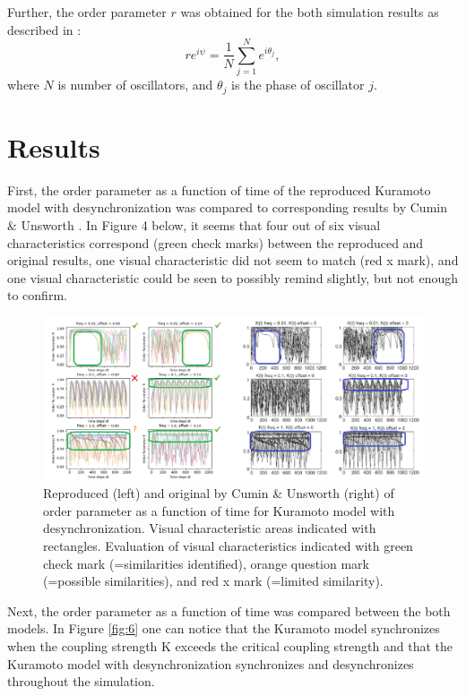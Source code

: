 \documentclass{article}
\begin{document}
Further, the order parameter \(r\) was obtained for the both simulation results as described in \cite{Cumin}:
\begin{equation}
re^{i\psi} = \frac{1}{N} \sum_{j=1}^{N} e^{i\theta_j},
\end{equation}
where \(N\) is number of oscillators, and \(\theta_j\) is the phase of oscillator \(j\).

\section{Results}

First, the order parameter as a function of time of the reproduced Kuramoto model with desynchronization was compared to corresponding results by Cumin \& Unsworth \cite{Cumin}. In Figure 4 below, it seems that four out of six visual characteristics correspond (green check marks) between the reproduced and original results, one visual characteristic did not seem to match (red x mark), and one visual characteristic could be seen to possibly remind slightly, but not enough to confirm.

\begin{figure}[H]
    \centering
    \includegraphics[width=15cm]{Proj_results.png}
    \caption{Reproduced (left) and original by Cumin \& Unsworth \cite{Cumin} (right) of order parameter as a function of time for Kuramoto model with desynchronization. Visual characteristic areas indicated with rectangles. Evaluation of visual characteristics indicated with green check mark (=similarities identified), orange question mark (=possible similarities), and red x mark (=limited similarity).}
    \label{fig:5}
\end{figure}

Next, the order parameter as a function of time was compared between the both models. In Figure \ref{fig:6} one can notice that the Kuramoto model synchronizes when the coupling strength K exceeds the critical coupling strength and that the Kuramoto model with desynchronization synchronizes and desynchronizes throughout the simulation.
\end{document}
